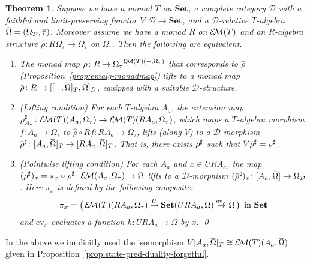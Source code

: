 \documentclass[9pt, preprint]{sigplanconf}
\theoremstyle{theorem}
\newtheorem{theorem}{Theorem}[section]
\theoremstyle{definition}
\newcommand{\cat}[1]{\mathcal{#1}}
\renewcommand{\bar}{\overbar}
\newcommand{\overbar}[1]{\mkern 1.5mu\overline{\mkern-1.5mu#1\mkern-1.5mu}\mkern 1.5mu}
\newcommand{\xxtos}[1]{\stackrel{#1}{\to}}
\newcommand{\place}{{-}}
\newcommand{\ev}{\mathrm{ev}}
\newcommand{\Set}{\mathbf{Set}}
\newcommand{\EM}{\mathcal{E}{\kern-.5ex}\mathcal{M}}
\newcommand{\OmegaD}{\Omega_{\cat{D}}}
\newcommand{\after}{\mathrel{\circ}}
\newcommand{\co}{\mathrel{\circ}}
\begin{document}
\begin{theorem}
  \label{thm:two-player-lifting}
  Suppose we have a monad $T$ on $\Set$, a complete category $\cat{D}$
 with a  faithful and limit-preserving functor
 $V \colon \cat{D}
\to \Set$,
and
  a $\cat{D}$-relative $T$-algebra $\bar{\Omega} = (\OmegaD, \bar{\tau})$.
  Moreover assume we have a monad $R$ on $\EM(T)$ and
  an $R$-algebra structure $\hat{\rho} \colon R{\Omega_{\tau}} \to {\Omega_{\tau}}$
  on ${\Omega_{\tau}}$. Then the following are equivalent.
  \begin{enumerate}
    \item The monad map $\rho \colon R \to {\Omega_{\tau}}^{\EM(T)(\place, \Omega_{\tau})}$
      that corresponds to $\hat{\rho}$
      (Proposition~\ref{prop:emalg-monadmap})
      lifts to a monad map $\bar{\rho} \colon R \to [[\place ,
	  \bar{\Omega}]_{T}, \bar{\Omega}]_{\cat{D}}$, equipped with a
	  suitable $\cat{D}$-structure.
    \item \emph{(Lifting condition)} For each $T$-algebra $A_a$, the extension map
      $\rho_{A_a}^{\sharp} \colon \EM(T)(A_a, \Omega_{\tau}) \to \EM(T)(R A_a, \Omega_{\tau})$,
      which maps a $T$-algebra morphism $f \colon A_a \to \Omega_{\tau}$
      to $\hat{\rho} \co Rf \colon R A_a \to \Omega_{\tau}$,
      lifts (along $V$) to a $\cat{D}$-morphism
      $\bar{\rho}^{\sharp} \colon [A_a, \bar{\Omega}]_{T} \to [R A_a, \bar{\Omega}]_{T}$.
      That is, there exists $\bar{\rho}^{\sharp}$ such that $V \bar{\rho}^{\sharp} = \rho^{\sharp}$.
    \item \emph{(Pointwise lifting condition)} For each $A_a$ and $x \in U R A_a$,
    the map
    $({\rho}^{\sharp})_x = \pi_x \after \rho^{\sharp} \colon \EM(A_a, \Omega_{\tau}) \to \Omega$
    lifts to a $\cat{D}$-morphism
    $(\bar{\rho}^{\sharp})_x \colon [A_a, \bar{\Omega}] \to \OmegaD$.
    Here $\pi_x$ is defined by the following composite:
    \begin{equation*}
      \pi_x =\bigl(\,
        \EM(T)(R A_a, \Omega_{\tau}) \xxtos{U} \Set(U R A_a, \Omega)
          \xxtos{\ev_x} \Omega \,\bigr) \enspace \text{in $\Set$}
    \end{equation*}
  and $\ev_x$ evaluates a function $h \colon U R A_a \to \Omega$ by $x$.
  \qed
  \end{enumerate}
\end{theorem}
\noindent  In the above we implicitly used the isomorphism
  $V [A_a, \bar{\Omega}]_{T} \cong \EM(T)(A_a, \bar{\Omega})$
  given in Proposition~\ref{prop:state-pred-duality-forgetful}.
\end{document}
